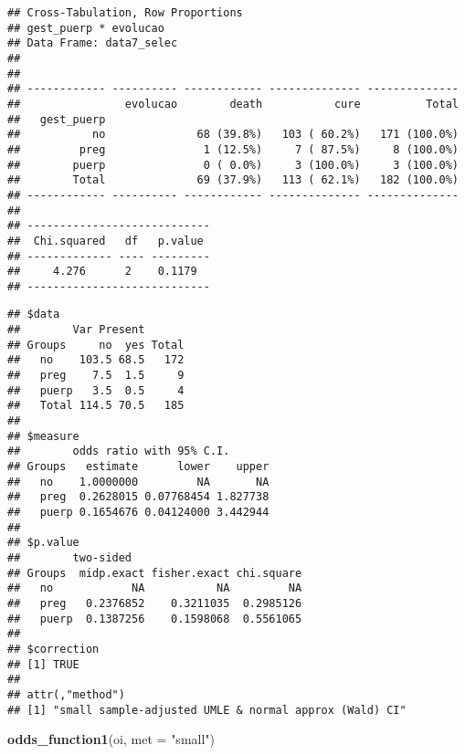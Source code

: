 \documentclass[
]{article}
\newenvironment{Shaded}{\begin{snugshade}}{\end{snugshade}}
\newcommand{\DataTypeTok}[1]{\textcolor[rgb]{0.13,0.29,0.53}{#1}}
\newcommand{\KeywordTok}[1]{\textcolor[rgb]{0.13,0.29,0.53}{\textbf{#1}}}
\newcommand{\NormalTok}[1]{#1}
\newcommand{\OperatorTok}[1]{\textcolor[rgb]{0.81,0.36,0.00}{\textbf{#1}}}
\newcommand{\StringTok}[1]{\textcolor[rgb]{0.31,0.60,0.02}{#1}}
\begin{document}
\begin{verbatim}
## Cross-Tabulation, Row Proportions  
## gest_puerp * evolucao  
## Data Frame: data7_selec  
## 
## 
## ------------ ---------- ------------ -------------- --------------
##                evolucao        death           cure          Total
##   gest_puerp                                                      
##           no              68 (39.8%)   103 ( 60.2%)   171 (100.0%)
##         preg               1 (12.5%)     7 ( 87.5%)     8 (100.0%)
##        puerp               0 ( 0.0%)     3 (100.0%)     3 (100.0%)
##        Total              69 (37.9%)   113 ( 62.1%)   182 (100.0%)
## ------------ ---------- ------------ -------------- --------------
## 
## ----------------------------
##  Chi.squared   df   p.value 
## ------------- ---- ---------
##     4.276      2    0.1179  
## ----------------------------
\end{verbatim}

\begin{Shaded}
\end{Shaded}

\begin{verbatim}
## $data
##        Var Present
## Groups     no  yes Total
##   no    103.5 68.5   172
##   preg    7.5  1.5     9
##   puerp   3.5  0.5     4
##   Total 114.5 70.5   185
## 
## $measure
##        odds ratio with 95% C.I.
## Groups   estimate      lower    upper
##   no    1.0000000         NA       NA
##   preg  0.2628015 0.07768454 1.827738
##   puerp 0.1654676 0.04124000 3.442944
## 
## $p.value
##        two-sided
## Groups  midp.exact fisher.exact chi.square
##   no            NA           NA         NA
##   preg   0.2376852    0.3211035  0.2985126
##   puerp  0.1387256    0.1598068  0.5561065
## 
## $correction
## [1] TRUE
## 
## attr(,"method")
## [1] "small sample-adjusted UMLE & normal approx (Wald) CI"
\end{verbatim}

\begin{Shaded}
\begin{Highlighting}[]
\KeywordTok{odds_function1}\NormalTok{(oi, }\DataTypeTok{met =} \StringTok{"small"}\NormalTok{)}
\end{Highlighting}
\end{Shaded}
\end{document}
